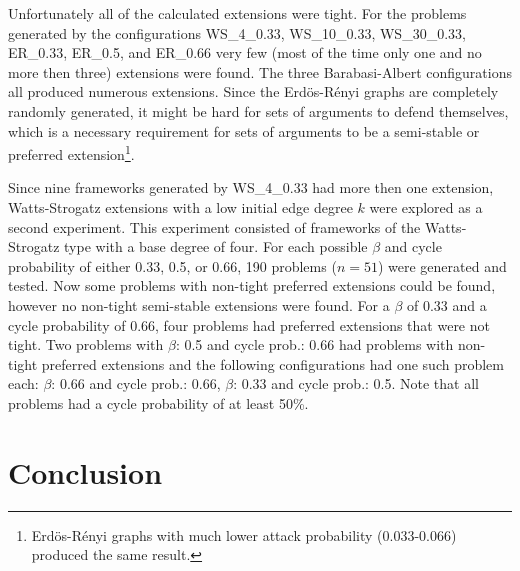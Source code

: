 \documentclass[parskip=half]{scrartcl}
\begin{document}
Unfortunately all of the calculated extensions were tight. For the problems generated by the
configurations WS\_4\_0.33, WS\_10\_0.33, WS\_30\_0.33, ER\_0.33, ER\_0.5, and ER\_0.66
very few (most of the time only one and no more then three) extensions were found.
The three Barabasi-Albert configurations all produced numerous extensions.
Since the Erdös-Rényi graphs are completely randomly generated, it might be hard for sets of
arguments to defend themselves, which is a necessary requirement for sets of arguments to
be a semi-stable or preferred extension\footnote{Erdös-Rényi graphs with much lower attack probability
(0.033-0.066) produced the same result.}.

Since nine frameworks generated by WS\_4\_0.33 had more then one extension, Watts-Strogatz extensions
with a low initial edge degree $k$ were explored as a second experiment. This experiment consisted
of frameworks of the Watts-Strogatz type with a base degree of four. For each possible $\beta$
and cycle probability of either 0.33, 0.5, or 0.66, 190 problems ($n=51$) were generated and tested.
Now some problems with non-tight preferred extensions could be found, however no non-tight semi-stable
extensions were found. For a $\beta$ of 0.33 and a cycle probability of 0.66, four problems
had preferred extensions that were not tight. Two problems with $\beta$: 0.5 and cycle prob.: 0.66
had problems with non-tight preferred extensions and the following configurations had one such
problem each: $\beta$: 0.66 and cycle prob.: 0.66, $\beta$: 0.33 and cycle prob.: 0.5.
Note that all problems had a cycle probability of at least 50\%.

\section{Conclusion}
\label{conclusion}

\printbibliography
\end{document}
